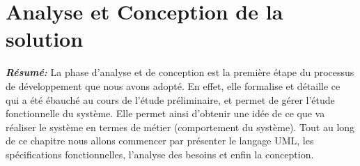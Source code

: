 \documentclass[a4paper, 12pt]{report}
\begin{document}
\chapter{Analyse et Conception de la solution}
\noindent \textit{\textbf{Résumé:} }
La phase d’analyse et de conception est la première étape du processus de développement que nous avons adopté. En effet, elle formalise et détaille ce qui a été ébauché au cours de l’étude préliminaire, et permet de gérer l’étude fonctionnelle du système. Elle permet ainsi d’obtenir une idée de ce que va réaliser le système en termes de métier (comportement du système).
Tout au long de ce chapitre nous allons commencer par présenter le langage UML, les spécifications fonctionnelles, l’analyse des besoins et enfin la conception. 

\setcounter{minitocdepth}{1}
\minitoc
\end{document}
